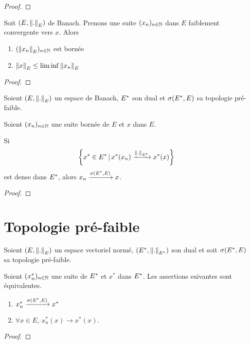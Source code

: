 \ifdefined\outputproof
\begin{proof}

\end{proof}
\fi

\begin{corollary}
	Soit $(E, \norm{.}_{E})$ de Banach.
	Prenons une suite $(x_{n})_{n \in \mathbb{N}}$ dans $E$ faiblement
	convergente vers $x$.
	Alors 
	\begin{enumerate}
		\item $(\norm{x_{n}}_{E})_{n \in \mathbb{N}}$ est bornée
		\item $\norm{x}_{E} \leq \lim\inf \norm{x_{n}}_{E}$
	\end{enumerate}
\end{corollary}

\ifdefined\outputproof
\begin{proof}

\end{proof}
\fi

\begin{proposition}
	Soient $(E, \norm{.}_{E})$ un espace de Banach,
	$E^{*}$ son dual et $\sigma(E^{*}, E)$ sa topologie pré-faible.

	Soient $(x_{n})_{n \in \mathbb{N}}$ une suite bornée de $E$ et $x$ dans
	$E$.

	Si
	\begin{equation}
		\left\{x^{*} \in E^{*} \, | \, x^{*}(x_{n})
		\xrightarrow{\norm{.}_{E^{*}}} x^{*}(x) \right\}
	\end{equation}
	est dense dans
	$E^{*}$, alors $x_{n} \xrightarrow{\sigma(E^{*}, E)} x$.
\end{proposition}

\ifdefined\outputproof
\begin{proof}

\end{proof}
\fi

\section{Topologie pré-faible}

\begin{proposition}
	Soient $(E, \norm{.}_{E})$ un espace vectoriel normé,
	$(E^{*}, \norm{.}_{E^{*}})$ son dual et soit
	$\sigma(E^{*}, E)$ sa topologie pré-faible.

	Soient $(x^{*}_{n})_{n \in \mathbb{N}}$ une suite de $E^{*}$ et
	$x^{*}$ dans $E^{*}$. Les assertions suivantes sont équivalentes.
	\begin{enumerate}
		\item $x^{*}_{n} \xrightarrow{\sigma(E^{*}, E)} x^{*}$
		\item $\forall x \in E$, $x^{*}_{n}(x) \rightarrow x^{*}(x)$.
	\end{enumerate}
\end{proposition}

\ifdefined\outputproof
\begin{proof}

\end{proof}
\fi
